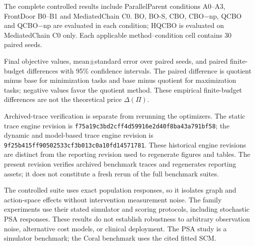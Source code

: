 The complete controlled results include ParallelParent conditions A0--A3,
FrontDoor B0--B1 and MediatedChain C0. BO, BO-S, CBO, CBO$-$np, QCBO and
QCBO$-$np are evaluated in each condition; HQCBO is evaluated on MediatedChain
C0 only. Each applicable method--condition cell contains 30 paired seeds.

Final objective values, mean$\pm$standard error over paired seeds, and paired
finite-budget differences with 95\% confidence intervals. The paired difference
is quotient minus base for minimization tasks and base minus quotient for
maximization tasks; negative values favor the quotient method. These empirical
finite-budget differences are not the theoretical price $\Delta(\Pi)$.

Archived-trace verification is separate from rerunning the optimizers.
The static trace engine revision is
\texttt{f75a19c3bd2cff4d59916e2d40f8ba43a791bf58}; the dynamic and model-based
trace engine revision is
\texttt{9f25b415ff90502533cf3b013c0a10fd14571781}.
These historical engine revisions are distinct from the reporting revision
used to regenerate figures and tables. The present revision verifies archived
benchmark traces and regenerates reporting assets; it does not constitute a
fresh rerun of the full benchmark suites.

The controlled suite uses exact population responses, so it isolates graph
and action-space effects without intervention measurement noise. The family
experiments use their stated simulator and scoring protocols, including
stochastic PSA responses. These results do not establish robustness to
arbitrary observation noise, alternative cost models, or clinical deployment.
The PSA study is a simulator benchmark; the Coral benchmark uses the cited
fitted SCM.
